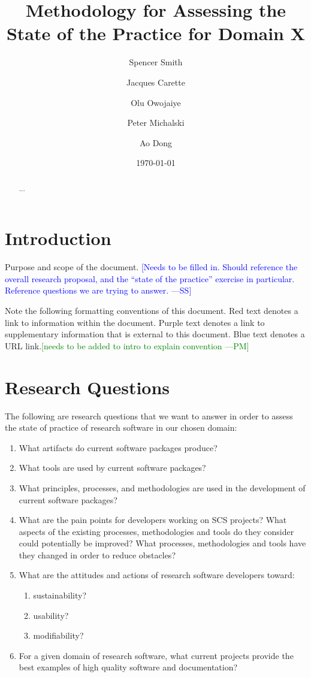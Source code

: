 \documentclass[letterpaper,cleveref]{lipics-v2019}
\title{Methodology for Assessing the State of the Practice for Domain X}
\author{Spencer Smith}{McMaster University, Canada}{smiths@mcmaster.ca}{}{}
\author{Jacques Carette}{McMaster University, Canada}{carette@mcmaster.ca}{}{}
\author{Olu Owojaiye}{McMaster University, Canada}{owojaiyo@mcmaster.ca}{}{}
\author{Peter Michalski}{McMaster University, Canada}{michap@mcmaster.ca}{}{}
\author{Ao Dong}{McMaster University, Canada}{donga9@mcmaster.ca}{}{}
\date{\today}
\newcommand{\authornote}[3]{\textcolor{#1}{[#3 ---#2]}}
\newcommand{\authornote}[3]{}
\newcommand{\wss}[1]{\authornote{blue}{SS}{#1}} %
\newcommand{\pmi}[1]{\authornote{green}{PM}{#1}} %
\theoremstyle{definition}
\begin{document}
\maketitle

\begin{abstract}
	...
\end{abstract}

\tableofcontents

\section{Introduction} \label{SecIntroduction}

Purpose and scope of the document.  \wss{Needs to be filled in.  Should
  reference the overall research proposal, and the ``state of the practice''
  exercise in particular.  Reference questions we are trying to answer.}

Note the following formatting conventions of this document. Red text denotes a
link to information within the document. Purple text denotes a link to
supplementary information that is external to this document. Blue text denotes a
URL link.\pmi{needs to be added to intro to explain convention}

\section{Research Questions}\label{ResearchQuestions}

The following are research questions that we want to answer in order to assess the state of practice of research software in our chosen domain:

\begin{enumerate}
\item What artifacts do current software packages produce? 
\item What tools are used by current software packages?
\item What principles, processes, and methodologies are used in the development of current software packages?
\item What are the pain points for developers working on SCS projects? What aspects of the existing processes, methodologies and tools do they consider could potentially be improved? What processes, methodologies and tools have they changed in order to reduce obstacles?
\item What are the attitudes and actions of research software developers toward:
\begin{enumerate}
\item sustainability?
\item usability?
\item modifiability?
\end{enumerate} 
\item For a given domain of research software, what current projects provide the best examples of high quality software and documentation?
\end{enumerate}
\end{document}
